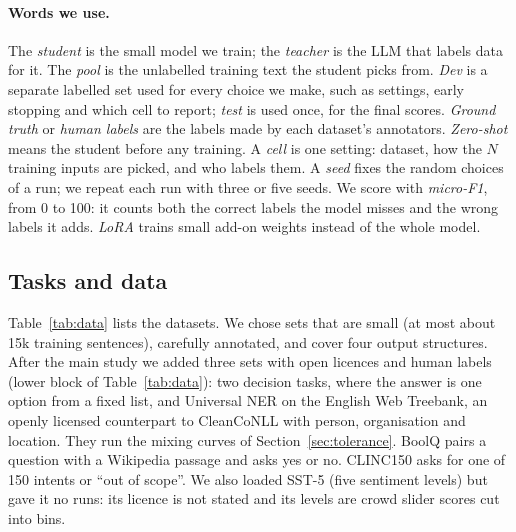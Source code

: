 \documentclass[11pt]{article}
\begin{document}
\paragraph{Words we use.} The \emph{student} is the small model we train; the \emph{teacher} is the LLM that labels data for it. The \emph{pool} is the unlabelled training text the student picks from. \emph{Dev} is a separate labelled set used for every choice we make, such as settings, early stopping and which cell to report; \emph{test} is used once, for the final scores. \emph{Ground truth} or \emph{human labels} are the labels made by each dataset's annotators. \emph{Zero-shot} means the student before any training. A \emph{cell} is one setting: dataset, how the $N$ training inputs are picked, and who labels them. A \emph{seed} fixes the random choices of a run; we repeat each run with three or five seeds. We score with \emph{micro-F1}, from 0 to 100: it counts both the correct labels the model misses and the wrong labels it adds. \emph{LoRA} trains small add-on weights instead of the whole model.

\subsection{Tasks and data}

Table~\ref{tab:data} lists the datasets. We chose sets that are small (at most about 15k training sentences), carefully annotated, and cover four output structures. After the main study we added three sets with open licences and human labels (lower block of Table~\ref{tab:data}): two decision tasks, where the answer is one option from a fixed list, and Universal NER on the English Web Treebank, an openly licensed counterpart to CleanCoNLL with person, organisation and location. They run the mixing curves of Section~\ref{sec:tolerance}. BoolQ pairs a question with a Wikipedia passage and asks yes or no. CLINC150 asks for one of 150 intents or ``out of scope''. We also loaded SST-5 (five sentiment levels) but gave it no runs: its licence is not stated and its levels are crowd slider scores cut into bins.
\end{document}
